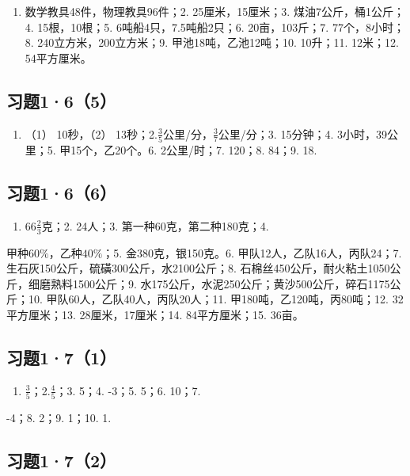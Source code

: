 \begin{enumerate}
\item
  数学教具48件，物理教具96件；2. 25厘米，15厘米；3.
  煤油7公斤，桶1公斤；4. 15根，10根；5. 6吨船4只，7.5吨船2只；6.
  20亩，103斤；7. 77个，8小时；8. 240立方米，200立方米；9.
  甲池18吨，乙池12吨；10. 10升；11. 12米；12. 54平方厘米。
\end{enumerate}

\subsection{习题1·6（5）}

\begin{enumerate}
\item
  （1） 10秒，（2）
  13秒；2.\(\frac{3}{5}\)公里/分，\(\frac{3}{7}\)公里/分；3. 15分钟；4.
  3小时，39公里；5. 甲15个，乙20个。6. 2公里/时；7. 120；8. 84；9. 18.
\end{enumerate}

\subsection{习题1·6（6）}

\begin{enumerate}[start=1]
\item
  \(66\frac{2}{3}\)克；2. 24人；3. 第一种60克，第二种180克；4.
\end{enumerate}
甲种\(60\%\)，乙种\(40\%\)；5. 金380克，银150克。6.
甲队12人，乙队16人，丙队24；7.
生石灰150公斤，硫磺300公斤，水2100公斤；8.
石棉丝450公斤，耐火粘土1050公斤，细磨熟料1500公斤；9.
水175公斤，水泥250公斤；黄沙500公斤，碎石1175公斤；10.
甲队60人，乙队40人，丙队20人；11. 甲180吨，乙120吨，丙80吨；12.
32平方厘米；13. 28厘米，17厘米；14. 84平方厘米；15. 36亩。

\subsection{习题1·7（1）}

\begin{enumerate}[start=1]
\item
  \(\frac{3}{5}\)；2.\(\frac{4}{5}\)；3. 5；4. -3；5. 5；6. 10；7.
\end{enumerate}
-4；8. 2；9. 1；10. 1.

\subsection{习题1·7（2）}

